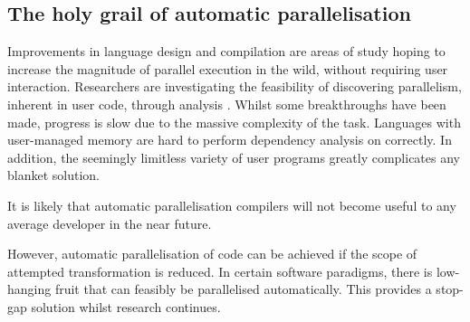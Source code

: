 \subsection{The holy grail of automatic parallelisation}
Improvements in language design and compilation are areas of study hoping to increase the magnitude of parallel execution in the wild, without requiring user interaction.
Researchers are investigating the feasibility of discovering parallelism, inherent in user code, through analysis \cite{auto_par}.
Whilst some breakthroughs have been made, progress is slow due to the massive complexity of the task.
Languages with user-managed memory are hard to perform dependency analysis on correctly. In addition, the seemingly limitless variety of user programs greatly complicates any blanket solution.

It is likely that automatic parallelisation compilers will not become useful to any average developer in the near future.

However, automatic parallelisation of code can be achieved if the scope of attempted transformation is reduced. In certain software paradigms, there is low-hanging fruit that can feasibly be parallelised automatically. This provides a stop-gap solution whilst research continues.

